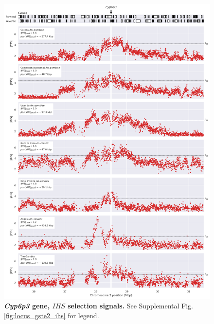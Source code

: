 \documentclass[a4paper,11pt,abstracton,hidelinks]{scrartcl}
\begin{document}
\begin{figure}[t!]
	\begin{center}
		\includegraphics*[width=1\linewidth,center]{artwork/locus_cyp6p3_ihs_pdist.png}
	\end{center}
	\caption[\textit{Cyp6p3} gene, $IHS$ selection signals]{
	\textbf{\textit{Cyp6p3} gene, $IHS$ selection signals.}
	See Supplemental Fig. \ref{fig:locus_gste2_ihs} for legend.
	} 
	\label{fig:locus_cyp6p3_ihs}
\end{figure}


\clearpage
\end{document}
